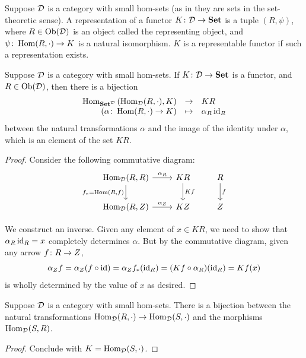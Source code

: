 \begin{definition}
    Suppose \(\mathcal{D}\) is a category with small hom-sets (as in they are sets in the set-theoretic sense).
    A representation of a functor \(K\colon\mathcal{D}\to\textbf{Set}\)
    is a tuple \((R,\psi)\), where \(R \in \operatorname{Ob}(\mathcal{D})\) is an object called the representing object,
    and \(\psi\colon\operatorname{Hom}(R,\cdot)\to K\) is a natural isomorphism.
    \(K\) is a representable functor if such a representation exists.
\end{definition}
\begin{lemma}\label{lem:yoneda}
    Suppose \(\mathcal{D}\) is a category with small hom-sets.
    If \(K\colon\mathcal{D}\to\textbf{Set}\) is a functor, and \(R \in \operatorname{Ob}(\mathcal{D})\),
    then there is a bijection
    \begin{equation*}
        \begin{array}{rcl}
            \Hom_{\textbf{Set}^\mca{D}}\pqty{\Hom_\mca{D}(R,\cdot),K} &\to & KR \\
            (\func{\alpha}{\Hom(R,\cdot)}{K}) &\mapsto & \alpha_R \id_R
        \end{array}
    \end{equation*}
    between the natural transformations \(\alpha\) and the image of the identity under \(\alpha\),
    which is an element of the set \(KR\).
\end{lemma}
\begin{proof}
    Consider the following commutative diagram:
    \begin{equation*}
        \begin{tikzcd}
            \Hom_\mca{D}(R,R) \arrow{d}[swap]{f_\ast = \Hom(R,f)} \arrow{r}{\alpha_R} & KR \arrow{d}{Kf} & R \arrow{d}{f} \\
            \Hom_\mca{D}(R,Z) \arrow{r}{\alpha_Z} & KZ & Z
        \end{tikzcd}
    \end{equation*}
    
    We construct an inverse.
    Given any element of \(x \in KR\), we need to show that \(\alpha_R \operatorname{id}_R = x\) completely determines \(\alpha\).
    But by the commutative diagram, given any arrow \(f\colon R\to Z\),
    \begin{equation*}
        \alpha_Z f = \alpha_Z(f \circ \operatorname{id}) = \alpha_Z f_\ast(\operatorname{id}_R) = (Kf \circ \alpha_R)(\operatorname{id}_R) = Kf(x)
    \end{equation*}
    is wholly determined by the value of \(x\) as desired.
\end{proof}
\begin{corollary}\label{cor:yoneda}
    Suppose \(\mathcal{D}\) is a category with small hom-sets.
    There is a bijection between the natural transformations
    \(\operatorname{Hom}_{\mathcal{D}}(R,\cdot) \to \operatorname{Hom}_{\mathcal{D}}(S,\cdot)\)
    and the morphisms \(\operatorname{Hom}_{\mathcal{D}}(S,R)\).
\end{corollary}
\begin{proof}
    Conclude with \(K = \operatorname{Hom}_{\mathcal{D}}(S,\cdot)\).
\end{proof}


